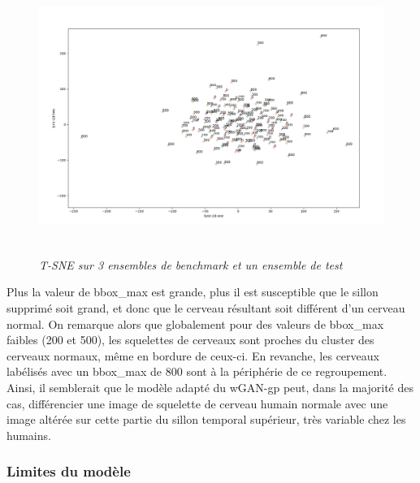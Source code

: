 \documentclass[12pt, oneside, a4paper, titlepage]{article}
\begin{document}
\begin{figure}
\centering
\includegraphics[width=15cm,height=9cm]{tsne_50b.png}
    \caption{\textit{T-SNE sur 3 ensembles de benchmark et un ensemble de test}}
    \label{fig:tsne2}
\end{figure}


Plus la valeur de bbox\_max est grande, plus il est susceptible que le sillon supprimé soit grand, et donc que le cerveau résultant soit différent d'un cerveau normal. On remarque alors que globalement pour des valeurs de bbox\_max faibles (200 et 500), les squelettes de cerveaux sont proches du cluster des cerveaux normaux, même en bordure de ceux-ci. En revanche, les cerveaux labélisés avec un bbox\_max de 800 sont à la périphérie de ce regroupement. Ainsi, il semblerait que  le modèle adapté du wGAN-gp peut, dans la majorité des cas, différencier une image de squelette de cerveau humain normale avec une image altérée sur cette partie du sillon temporal supérieur, très variable chez les humains.\\

\vspace{1cm}
\subsubsection{Limites du modèle}
\end{document}
